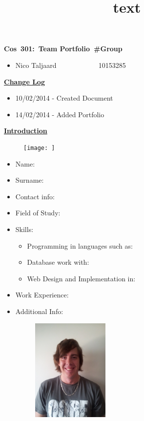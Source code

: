 \documentclass[12pt]{article}
\newcommand{\Title}{Team Portfolio\ \#Group } %
\newcommand{\Class}{Cos\ 301} %
\begin{document}
\title{text}
	\vspace{2in}
	\hspace{1.5in}
	\textmd{\textbf{\Class:\ \Title}}\\
	\vspace{1.5in}


\begin{itemize} %
	\item Nico Taljaard \ ~~~~~~~~~ \ 10153285
	
\end{itemize}

\newpage
\textbf{\underline{Change Log}}
\begin{itemize}
	\item 10/02/2014 - Created Document
	\item 14/02/2014 - Added Portfolio
\end{itemize}


\newpage
\textbf{\underline{Introduction}}


\newpage %
\begin{figure}[ht!]
	\centering
	\texttt{[image: ]}
\end{figure}

\begin{itemize}
	\item Name: \ ~~~~~~~~~~~~~~~ \ 
	\item Surname: \ ~~~~~~~~~~~ \ 
	\item Contact info: \ ~~~~~~ \  \newline 
	\item Field of Study: \ ~~~~ \ 
	\item Skills: \begin{itemize}
					\item Programming in languages such as:
					\item Database work with: 
					\item Web Design and Implementation in:     %
				  \end{itemize}
	\item Work Experience: \  \ 
	\item Additional Info: \ ~~ \ 
	
\end{itemize}

\newpage
\begin{figure}[ht!]
	\centering
	\includegraphics[width=2in, height=2in]{./Pictures/NicoTaljaard.jpg}
\end{figure}
\end{document}
